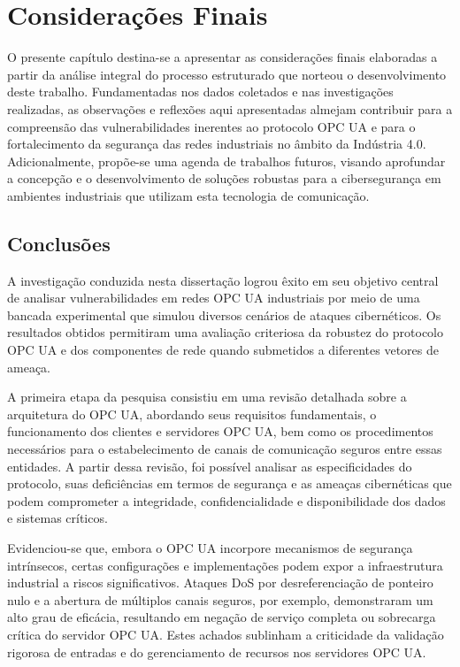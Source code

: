 \chapter{Considerações Finais} \label{cap:conclusao}

    O presente capítulo destina-se a apresentar as considerações finais elaboradas a partir da análise integral do processo estruturado que norteou o desenvolvimento deste trabalho. Fundamentadas nos dados coletados e nas investigações realizadas, as observações e reflexões aqui apresentadas almejam contribuir para a compreensão das vulnerabilidades inerentes ao protocolo OPC UA e para o fortalecimento da segurança das redes industriais no âmbito da Indústria 4.0. Adicionalmente, propõe-se uma agenda de trabalhos futuros, visando aprofundar a concepção e o desenvolvimento de soluções robustas para a cibersegurança em ambientes industriais que utilizam esta tecnologia de comunicação.

\section{Conclusões}

    A investigação conduzida nesta dissertação logrou êxito em seu objetivo central de analisar vulnerabilidades em redes OPC UA industriais por meio de uma bancada experimental que simulou diversos cenários de ataques cibernéticos. Os resultados obtidos permitiram uma avaliação criteriosa da robustez do protocolo OPC UA e dos componentes de rede quando submetidos a diferentes vetores de ameaça.

    A primeira etapa da pesquisa consistiu em uma revisão detalhada sobre a arquitetura do OPC UA, abordando seus requisitos fundamentais, o funcionamento dos clientes e servidores OPC UA, bem como os procedimentos necessários para o estabelecimento de canais de comunicação seguros entre essas entidades. A partir dessa revisão, foi possível analisar as especificidades do protocolo, suas deficiências em termos de segurança e as ameaças cibernéticas que podem comprometer a integridade, confidencialidade e disponibilidade dos dados e sistemas críticos.

    Evidenciou-se que, embora o OPC UA incorpore mecanismos de segurança intrínsecos, certas configurações e implementações podem expor a infraestrutura industrial a riscos significativos. Ataques DoS por desreferenciação de ponteiro nulo e a abertura de múltiplos canais seguros, por exemplo, demonstraram um alto grau de eficácia, resultando em negação de serviço completa ou sobrecarga crítica do servidor OPC UA. Estes achados sublinham a criticidade da validação rigorosa de entradas e do gerenciamento de recursos nos servidores OPC UA.

